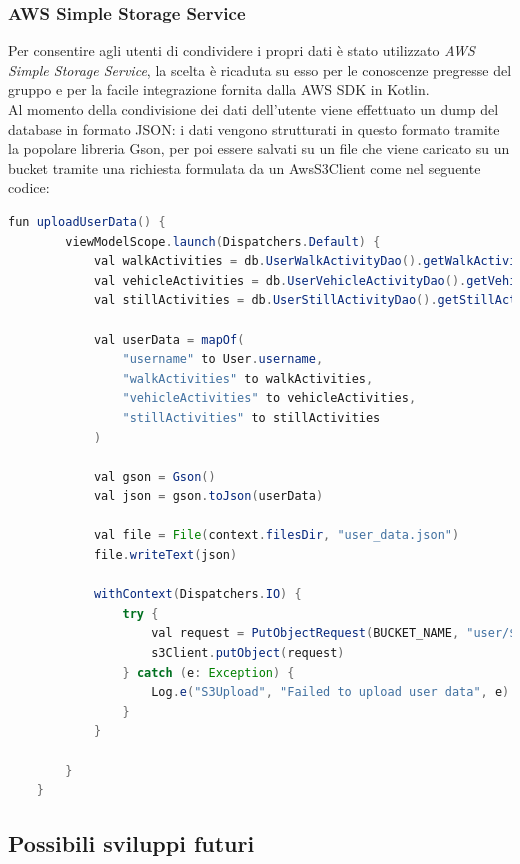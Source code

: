 \documentclass{article}
\begin{document}
\subsubsection*{AWS Simple Storage Service}
Per consentire agli utenti di condividere i propri dati è stato utilizzato \textit{AWS Simple Storage Service}, la scelta è ricaduta su esso per le conoscenze pregresse del gruppo e per la facile integrazione fornita dalla AWS SDK in Kotlin.\\
Al momento della condivisione dei dati dell'utente viene effettuato un dump del database in formato JSON: i dati vengono strutturati in questo formato tramite la popolare libreria Gson, per poi essere salvati su un file che viene caricato su un bucket tramite una richiesta formulata da un AwsS3Client come nel seguente codice:\\
\begin{lstlisting}[language=Java]
    fun uploadUserData() {
        viewModelScope.launch(Dispatchers.Default) {
            val walkActivities = db.UserWalkActivityDao().getWalkActivitiesByUserId(User.id)
            val vehicleActivities = db.UserVehicleActivityDao().getVehicleActivitiesByUserId(User.id)
            val stillActivities = db.UserStillActivityDao().getStillActivitiesByUserId(User.id)

            val userData = mapOf(
                "username" to User.username,
                "walkActivities" to walkActivities,
                "vehicleActivities" to vehicleActivities,
                "stillActivities" to stillActivities
            )

            val gson = Gson()
            val json = gson.toJson(userData)

            val file = File(context.filesDir, "user_data.json")
            file.writeText(json)

            withContext(Dispatchers.IO) {
                try {
                    val request = PutObjectRequest(BUCKET_NAME, "user/${User.username}.json", file)
                    s3Client.putObject(request)
                } catch (e: Exception) {
                    Log.e("S3Upload", "Failed to upload user data", e)
                }
            }

        }
    }

\end{lstlisting}
\subsection*{Possibili sviluppi futuri}
\end{document}
